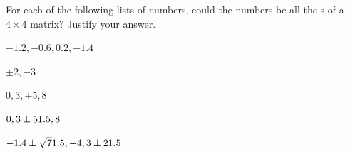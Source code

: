 \sectionExercises





\begin{exercise}  
For each of the following lists of numbers, could the numbers be all the s of a \(4\times4\) matrix? 
Justify your answer.
\begin{Parts}
\item \(-1.2,-0.6,0.2,-1.4\)

\item \(\pm2,-3\)

\item \(0,3,\pm5,8\)

\item \(0,3\pm51.5,8\)

\begin{OmitV1}
\item \(-1.4\pm\sqrt71.5,-4,3\pm21.5\)
\end{OmitV1}

\end{Parts}
\end{exercise}





